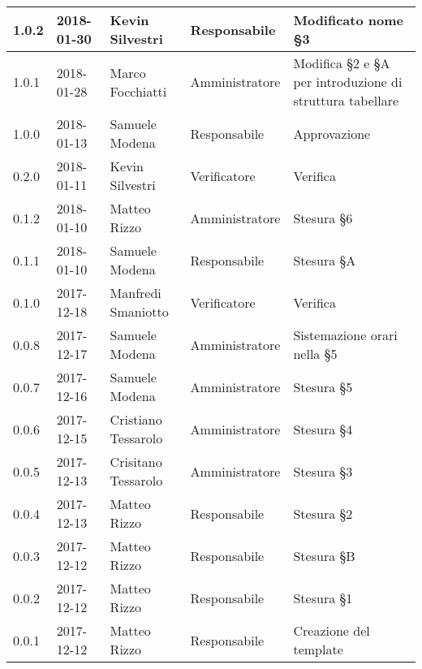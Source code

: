 \documentclass[./PianodiProgetto.tex]{subfiles}
\begin{document}
\begin{longtable}{|p{20mm}|p{20mm}|p{40mm}|p{30mm}|p{50mm}|}
		\hline 1.0.2 & 2018-01-30 & Kevin Silvestri & Responsabile & Modificato nome §3 \\
		
		\hline 1.0.1 & 2018-01-28 & Marco Focchiatti & Amministratore & Modifica §2 e §A per introduzione di struttura tabellare \\
	
		\hline 1.0.0 & 2018-01-13 & Samuele Modena & Responsabile & Approvazione \\
 
		\hline 0.2.0 & 2018-01-11 & Kevin Silvestri & Verificatore & Verifica \\
 
		\hline 0.1.2 & 2018-01-10 & Matteo Rizzo & Amministratore & Stesura §6 \\
 
		\hline 0.1.1 & 2018-01-10 & Samuele Modena & Responsabile & Stesura §A \\
 
		\hline 0.1.0 & 2017-12-18 & Manfredi Smaniotto & Verificatore & Verifica \\
 		
 		\hline 0.0.8 & 2017-12-17 & Samuele Modena & Amministratore & Sistemazione orari nella §5 \\
 		
		\hline 0.0.7 & 2017-12-16 & Samuele Modena & Amministratore & Stesura §5 \\
 
		\hline 0.0.6 & 2017-12-15 & Cristiano Tessarolo & Amministratore & Stesura §4 \\
 
		\hline 0.0.5 & 2017-12-13 & Crisitano Tessarolo & Amministratore & Stesura §3 \\
 
		\hline 0.0.4 & 2017-12-13 & Matteo Rizzo & Responsabile & Stesura §2 \\
 
 		\hline 0.0.3 & 2017-12-12 & Matteo Rizzo & Responsabile & Stesura §B \\
 		
		\hline 0.0.2 & 2017-12-12 & Matteo Rizzo & Responsabile & Stesura §1 \\
 
 		\hline 0.0.1 & 2017-12-12 & Matteo Rizzo & Responsabile & Creazione del template \\
 
		\hline
 
	\end{longtable}
\end{document}

